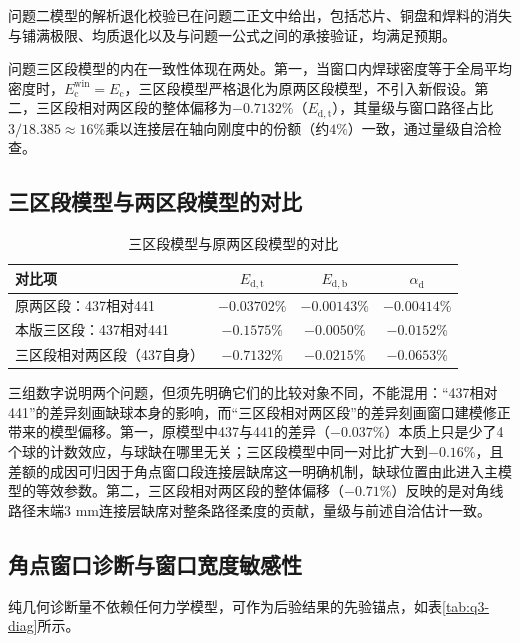 \documentclass[draft,12pt,a4paper]{ctexart}
\theoremstyle{definition}
\begin{document}
问题二模型的解析退化校验已在问题二正文中给出，包括芯片、铜盘和焊料的消失与铺满极限、均质退化以及与问题一公式之间的承接验证，均满足预期。

问题三区段模型的内在一致性体现在两处。第一，当窗口内焊球密度等于全局平均密度时，$E_{\mathrm c}^{\mathrm{win}}=E_{\mathrm c}$，三区段模型严格退化为原两区段模型，不引入新假设。第二，三区段相对两区段的整体偏移为$-0.7132\%$（$E_{\mathrm{d,t}}$），其量级与窗口路径占比$3/18.385\approx16\%$乘以连接层在轴向刚度中的份额（约$4\%$）一致，通过量级自洽检查。

\subsection{三区段模型与两区段模型的对比}

\begin{table}[H]\centering
  \caption{三区段模型与原两区段模型的对比}\label{tab:q3-cmp}
  \small
  \begin{tabular}{lccc}
    \toprule
    \textbf{对比项} & $E_{\mathrm{d,t}}$ & $E_{\mathrm{d,b}}$ & $\alpha_{\mathrm d}$ \\
    \midrule
    原两区段：437相对441 & $-0.03702\%$ & $-0.00143\%$ & $-0.00414\%$ \\
    本版三区段：437相对441 & $\mathbf{-0.1575\%}$ & $\mathbf{-0.0050\%}$ & $\mathbf{-0.0152\%}$ \\
    三区段相对两区段（437自身） & $-0.7132\%$ & $-0.0215\%$ & $-0.0653\%$ \\
    \bottomrule
  \end{tabular}
\end{table}

三组数字说明两个问题，但须先明确它们的比较对象不同，不能混用：“437相对441”的差异刻画缺球本身的影响，而“三区段相对两区段”的差异刻画窗口建模修正带来的模型偏移。第一，原模型中437与441的差异（$-0.037\%$）本质上只是少了4个球的计数效应，与球缺在哪里无关；三区段模型中同一对比扩大到$-0.16\%$，且差额的成因可归因于角点窗口段连接层缺席这一明确机制，缺球位置由此进入主模型的等效参数。第二，三区段相对两区段的整体偏移（$-0.71\%$）反映的是对角线路径末端3 mm连接层缺席对整条路径柔度的贡献，量级与前述自洽估计一致。

\subsection{角点窗口诊断与窗口宽度敏感性}

纯几何诊断量不依赖任何力学模型，可作为后验结果的先验锚点，如表\ref{tab:q3-diag}所示。
\end{document}
